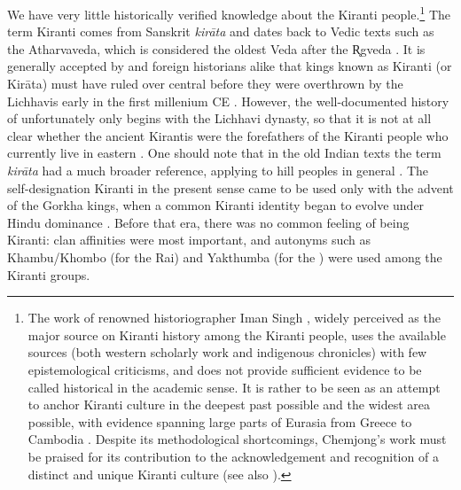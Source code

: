 We have very little historically verified knowledge about the Kiranti people.\footnote{The work of renowned  historiographer Iman Singh \citet{Chemjong1967History}, widely perceived as the major source on Kiranti history among the Kiranti people, uses the available sources (both western scholarly work and indigenous chronicles) with few epistemological criticisms, and does not provide sufficient evidence to be called historical in the academic sense. It is rather to be seen as an attempt to anchor Kiranti culture in the deepest past possible and the widest  area possible, with  evidence spanning large parts of Eurasia from Greece to Cambodia \citep[125]{Schlemmer2003_New}. Despite its methodological shortcomings, Chemjong's work must be praised for its contribution to the acknowledgement and recognition of a distinct and unique Kiranti culture (see also \citealt[340]{Gaenszle2002_Remaking}).} The term Kiranti comes from Sanskrit \emph{kirāta} and dates back to Vedic texts such as the Atharvaveda, which is considered the oldest Veda after the   R̥gveda \citep[594]{Driem2001Languages}. It is generally accepted by  and foreign historians alike that kings known as Kiranti (or Kirāta) must have ruled over central  before they were overthrown by the Lichhavis early in the first millenium CE \citep[13]{Whelpton2005A-History}.  However, the well-documented history of  unfortunately only begins with the Lichhavi dynasty, so that it is not at all clear whether the ancient Kirantis were the forefathers of the Kiranti people who currently live in eastern . One should note that in  the old Indian texts the term \emph{kirāta} had a much broader reference, applying to  hill peoples in general \citep{Whelpton2005A-History, Schlemmer2003_New}. The self-designation Kiranti in the present sense came to be used only with the advent of the Gorkha kings, when a common Kiranti identity began to evolve under Hindu dominance \citep[340]{Gaenszle2002_Remaking}. Before that era, there was no common feeling of being Kiranti: clan affinities were most important, and autonyms such as Khambu/Khombo (for the Rai) and Yakthumba (for the ) were used among the Kiranti groups.


